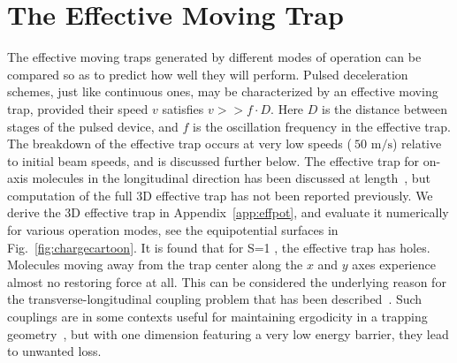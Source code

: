 \documentclass[%
 reprint,
 amsmath,amssymb,
 aps,
prl,
]{revtex4-1}
\newcommand{\SO}{{S=1 }}
\begin{document}
\section{The Effective Moving Trap}
The effective moving traps generated by different modes of operation can be compared so as to predict how well they will perform.
Pulsed deceleration schemes, just like continuous ones, may be characterized by an effective moving trap, provided their speed $v$ satisfies $v >> f\cdot D$. 
Here $D$ is the distance between stages of the pulsed device, and $f$ is the oscillation frequency in the effective trap. 
The breakdown of the effective trap occurs at very low speeds ($~50\text{ m/s}$) relative to initial beam speeds, and is discussed further below.
The effective trap for on-axis molecules in the longitudinal direction has been discussed at length~\cite{Bethlem2000,Hudson2004}, but computation of the full 3D effective trap has not been reported previously.
We derive the 3D effective trap in Appendix~\ref{app:effpot}, and evaluate it numerically for various operation modes, see the equipotential surfaces in Fig.~\ref{fig:chargecartoon}.
It is found that for \SO, the effective trap has holes. 
Molecules moving away from the trap center along the $x$ and $y$ axes experience almost no restoring force at all. 
This can be considered the underlying reason for the transverse-longitudinal coupling problem that has been described~\cite{VanDeMeerakker2006}. 
Such couplings are in some contexts useful for maintaining ergodicity in a trapping geometry~\cite{Surkov1996}, but with one dimension featuring a very low energy barrier, they lead to unwanted loss.
\end{document}
